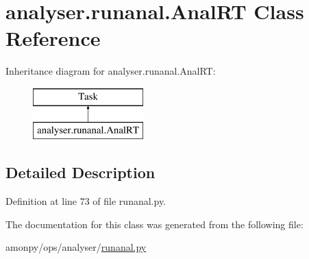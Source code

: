 \hypertarget{classanalyser_1_1runanal_1_1_anal_r_t}{\section{analyser.\-runanal.\-Anal\-R\-T Class Reference}
\label{classanalyser_1_1runanal_1_1_anal_r_t}
}
Inheritance diagram for analyser.\-runanal.\-Anal\-R\-T\-:\begin{figure}[H]
\begin{center}
\leavevmode
\includegraphics[height=2.000000cm]{d7/dd8/classanalyser_1_1runanal_1_1_anal_r_t}
\end{center}
\end{figure}


\subsection{Detailed Description}


Definition at line 73 of file runanal.\-py.



The documentation for this class was generated from the following file\-:\begin{DoxyCompactItemize}
\item 
amonpy/ops/analyser/\hyperlink{runanal_8py}{runanal.\-py}\end{DoxyCompactItemize}

